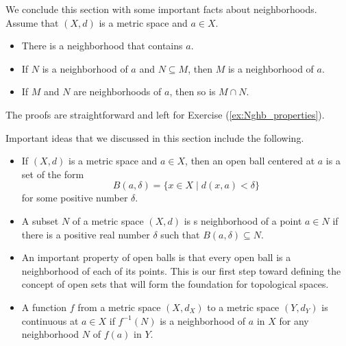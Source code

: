 \begin{comment}

\ActivitySolution
\ba
\item We need to show that the inverse image of any open ball centered at $f(a)$ contains an open ball centered at $a$.

\item We showed earlier that an open ball is a neighborhood of each of its points.

\item Our hypothesis tells us that $f^{-1}\left(B(f(a), \epsilon)\right)$ is a neighborhood of $a$ in $X$. 

\item As a neighborhood of $a$, it follows that there exists $\delta > 0$ such that $B(a, \delta) \subseteq f^{-1}\left(B(f(a), \epsilon)\right)$. 

\item The previous parts show that given any $\epsilon > 0$ there exists $\delta > 0$ such that $B(a, \delta) \subseteq f^{-1}\left(B(f(a), \epsilon)\right)$. Theorem \ref{thm:open_ball_continuity} then shows that $f$ is continuous at $a$. 

\ea

\end{comment}

\noindent We conclude this section with some important facts about neighborhoods. Assume that $(X,d)$ is a metric space and $a \in X$. 

\begin{itemize}
\item There is a neighborhood that contains $a$.
\item If $N$ is a neighborhood of $a$ and $N \subseteq M$, then $M$ is a neighborhood of $a$.
\item If $M$ and $N$ are neighborhoods of $a$, then so is $M \cap N$.
\end{itemize}

The proofs are straightforward and left for Exercise (\ref{ex:Nghb_properties}).

\label{sec_open_balls_summ}
Important ideas that we discussed in this section include the following.
\begin{itemize}
\item If $(X,d)$ is a metric space and $a \in X$, then an open ball centered at $a$ is a set of the form
\[B(a,\delta) = \{ x \in X \mid d(x,a) < \delta\}\]
for some positive number $\delta$. 
\item A subset $N$ of a metric space $(X,d)$ is s neighborhood of a point $a \in N$ if there is a positive real number $\delta$ such that $B(a,\delta) \subseteq N$.
\item An important property of open balls is that every open ball is a neighborhood of each of its points. This is our first step toward defining the concept of open sets that will form the foundation for topological spaces. 
\item A function $f$ from a metric space $(X,d_X)$ to a metric space $(Y,d_Y)$ is continuous at $a \in X$ if $f^{-1}(N)$ is a neighborhood of $a$ in $X$ for any neighborhood $N$ of $f(a)$ in $Y$. 
\end{itemize}


